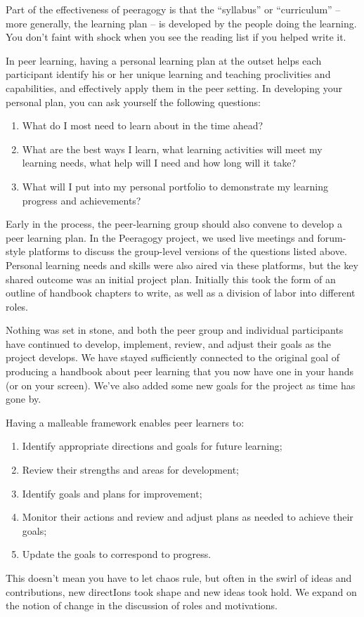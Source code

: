 Part of the effectiveness of peeragogy is that the ``syllabus'' or
``curriculum'' -- more generally, the learning plan -- is developed by
the people doing the learning. You don't faint with shock when you see
the reading list if you helped write it.

In peer learning, having a personal learning plan at the outset helps
each participant identify his or her unique learning and teaching
proclivities and capabilities, and effectively apply them in the peer
setting. In developing your personal plan, you can ask yourself the
following questions:

\begin{enumerate}
\item
  What do I most need to learn about in the time ahead?
\item
  What are the best ways I learn, what learning activities will meet my
  learning needs, what help will I need and how long will it take?
\item
  What will I put into my personal portfolio to demonstrate my learning
  progress and achievements?
\end{enumerate}
Early in the process, the peer-learning group should also convene to
develop a peer learning plan. In the Peeragogy project, we used live
meetings and forum-style platforms to discuss the group-level versions
of the questions listed above. Personal learning needs and skills were
also aired via these platforms, but the key shared outcome was an
initial project plan. Initially this took the form of an outline of
handbook chapters to write, as well as a division of labor into
different roles.

Nothing was set in stone, and both the peer group and individual
participants have continued to develop, implement, review, and adjust
their goals as the project develops. We have stayed sufficiently
connected to the original goal of producing a handbook about peer
learning that you now have one in your hands (or on your screen). We've
also added some new goals for the project as time has gone by.

Having a malleable framework enables peer learners to:

\begin{enumerate}
\item
  Identify appropriate directions and goals for future learning;
\item
  Review their strengths and areas for development;
\item
  Identify goals and plans for improvement;
\item
  Monitor their actions and review and adjust plans as needed to achieve
  their goals;
\item
  Update the goals to correspond to progress.
\end{enumerate}
This doesn't mean you have to let chaos rule, but often in the swirl of
ideas and contributions, new directIons took shape and new ideas took
hold. We expand on the notion of change in the discussion of roles and
motivations.

